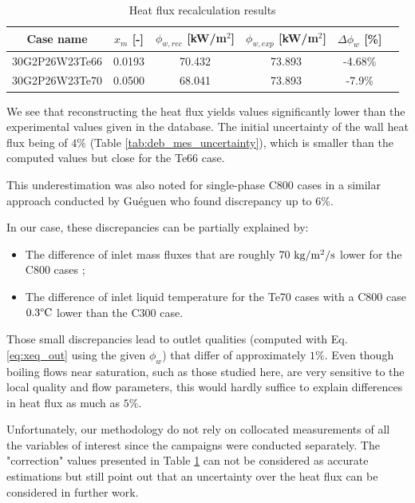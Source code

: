 \begin{table}[!h]
\centering

\begin{tabular}{c||c|c|c|c|c}
Case name & $x_{m}$ [-] & $\phi_{w,rec}$ [kW/m$^{2}$] & $\phi_{w,exp}$ [kW/m$^{2}$] & $\Delta \phi_{w}$ [\%]  \\
\hline
\hline
30G2P26W23Te66 & 0.0193 & 70.432 & 73.893 & -4.68\%\\
\hline
30G2P26W23Te70 & 0.0500 & 68.041 & 73.893 & -7.9\%\\
\end{tabular}

\caption{Heat flux recalculation results}
\label{tab:debora_flux_corr_res}

\end{table}

\npar
We see that reconstructing the heat flux yields values significantly lower than the experimental values given in the database. The initial uncertainty of the wall heat flux being of $4\%$ (Table \ref{tab:deb_mes_uncertainty}), which is smaller than the computed values but close for the Te66 case.

\npar

\begin{note*}{}
This underestimation was also noted for single-phase C800 cases in a similar approach conducted by Guéguen \cite{gueguen_contribution_2013} who found discrepancy up to 6\%.
\end{note*}

\npar


In our case, these discrepancies can be partially explained by:
\begin{itemize}
\item The difference of inlet mass fluxes that are roughly 70 $\text{kg/m$^{2}$/s}$ lower for the C800 cases ;
\item The difference of inlet liquid temperature for the Te70 cases with a C800 case $0.3\degree\mathrm{C}$ lower than the C300 case.
\end{itemize} 

Those small discrepancies lead to outlet qualities (computed with Eq. \ref{eq:xeq_out} using the given $\phi_{w}$) that differ of approximately $1\%$. Even though boiling flows near saturation, such as those studied here, are very sensitive to the local quality and flow parameters, this would hardly suffice to explain differences in heat flux as much as $5\%$.

\npar
\begin{remark*}{}
Unfortunately, our methodology do not rely on collocated measurements of all the variables of interest since the campaigns were conducted separately. The "correction" values presented in Table \ref{tab:debora_flux_corr_res} can not be considered as accurate estimations but still point out that an uncertainty over the heat flux can be considered in further work.
\end{remark*}



